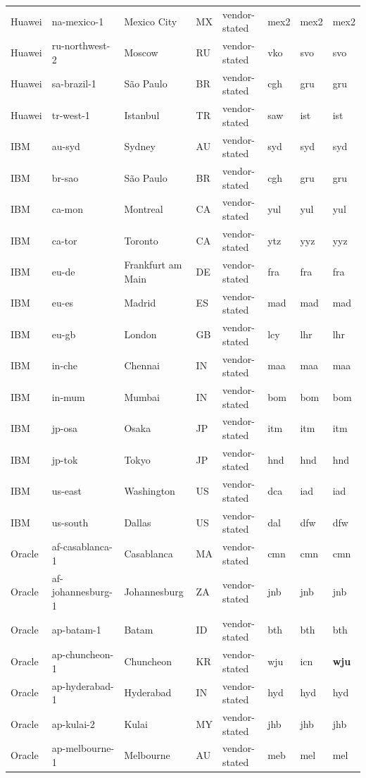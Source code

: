 \begin{longtable}{llllllll}
Huawei & na-mexico-1 & Mexico City & MX & vendor-stated & mex2 & mex2 & mex2 \\
Huawei & ru-northwest-2 & Moscow & RU & vendor-stated & vko & svo & svo \\
Huawei & sa-brazil-1 & São Paulo & BR & vendor-stated & cgh & gru & gru \\
Huawei & tr-west-1 & Istanbul & TR & vendor-stated & saw & ist & ist \\
IBM & au-syd & Sydney & AU & vendor-stated & syd & syd & syd \\
IBM & br-sao & São Paulo & BR & vendor-stated & cgh & gru & gru \\
IBM & ca-mon & Montreal & CA & vendor-stated & yul & yul & yul \\
IBM & ca-tor & Toronto & CA & vendor-stated & ytz & yyz & yyz \\
IBM & eu-de & Frankfurt am Main & DE & vendor-stated & fra & fra & fra \\
IBM & eu-es & Madrid & ES & vendor-stated & mad & mad & mad \\
IBM & eu-gb & London & GB & vendor-stated & lcy & lhr & lhr \\
IBM & in-che & Chennai & IN & vendor-stated & maa & maa & maa \\
IBM & in-mum & Mumbai & IN & vendor-stated & bom & bom & bom \\
IBM & jp-osa & Osaka & JP & vendor-stated & itm & itm & itm \\
IBM & jp-tok & Tokyo & JP & vendor-stated & hnd & hnd & hnd \\
IBM & us-east & Washington & US & vendor-stated & dca & iad & iad \\
IBM & us-south & Dallas & US & vendor-stated & dal & dfw & dfw \\
Oracle & af-casablanca-1 & Casablanca & MA & vendor-stated & cmn & cmn & cmn \\
Oracle & af-johannesburg-1 & Johannesburg & ZA & vendor-stated & jnb & jnb & jnb \\
Oracle & ap-batam-1 & Batam & ID & vendor-stated & bth & bth & bth \\
Oracle & ap-chuncheon-1 & Chuncheon & KR & vendor-stated & wju & icn & \textbf{wju} \\
Oracle & ap-hyderabad-1 & Hyderabad & IN & vendor-stated & hyd & hyd & hyd \\
Oracle & ap-kulai-2 & Kulai & MY & vendor-stated & jhb & jhb & jhb \\
Oracle & ap-melbourne-1 & Melbourne & AU & vendor-stated & meb & mel & mel \\

\end{longtable}
